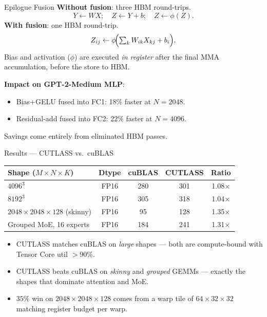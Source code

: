 \documentclass[10pt,aspectratio=169]{beamer}
\begin{document}
\begin{frame}{Epilogue Fusion}
  \textbf{Without fusion}: three HBM round-trips.
  \[
    Y \leftarrow W X;\quad Z \leftarrow Y + b;\quad Z \leftarrow \phi(Z).
  \]
  \textbf{With fusion}: one HBM round-trip.
  \[
    Z_{ij} \leftarrow \phi\!\Bigl(\textstyle\sum_k W_{ik} X_{kj} + b_i\Bigr).
  \]
  \vspace{1ex}
  Bias and activation ($\phi$) are executed \emph{in register} after
  the final MMA accumulation, before the store to HBM.
  \vspace{2ex}

  \textbf{Impact on GPT-2-Medium MLP}:
  \begin{itemize}
    \item Bias+GELU fused into FC1: \alert{18\%} faster at $N{=}2048$.
    \item Residual-add fused into FC2: \alert{22\%} faster at $N{=}4096$.
  \end{itemize}
  Savings come entirely from eliminated HBM passes.
\end{frame}

\begin{frame}{Results — CUTLASS vs.\ cuBLAS}
  \footnotesize
  \begin{tabular}{@{}lcccc@{}}
    \toprule
    \textbf{Shape ($M{\times}N{\times}K$)} & \textbf{Dtype}
    & \textbf{cuBLAS} & \textbf{CUTLASS} & \textbf{Ratio}\\
    \midrule
    $4096^3$                      & FP16 & 280 & 301 & 1.08$\times$\\
    $8192^3$                      & FP16 & 305 & 318 & 1.04$\times$\\
    $2048\times2048\times128$ (skinny) & FP16 & 95  & 128 & \alert{1.35$\times$}\\
    Grouped MoE, 16 experts       & FP16 & 184 & 241 & \alert{1.31$\times$}\\
    \bottomrule
  \end{tabular}
  \vspace{2ex}

  \begin{itemize}
    \item CUTLASS matches cuBLAS on \emph{large} shapes — both are
          compute-bound with Tensor Core util $>90\%$.
    \item CUTLASS beats cuBLAS on \emph{skinny} and \emph{grouped}
          GEMMs — exactly the shapes that dominate attention and MoE.
    \item $35\%$ win on $2048{\times}2048{\times}128$ comes from a
          warp tile of $64{\times}32{\times}32$ matching register
          budget per warp.
  \end{itemize}
\end{frame}
\end{document}
